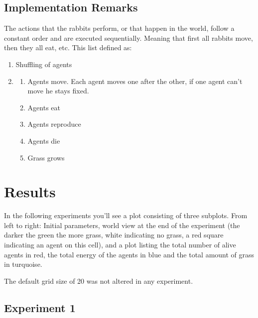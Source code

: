 \documentclass[11pt]{article}
\newenvironment{mEnumerate}
{ \begin{enumerate}
    \setlength{\itemsep}{0pt}
    \setlength{\parskip}{0pt}
    \setlength{\parsep}{0pt}     }
{ \end{enumerate}                  }
\begin{document}
\subsection{Implementation Remarks}\label{sec:implementation-remarks}

The actions that the rabbits perform, or that happen in the world, follow a constant order and are executed sequentially. Meaning that first all rabbits move, then they all eat, etc. This list defined as:

\begin{mEnumerate}
    \item Shuffling of agents
    \item \begin{mEnumerate}
        \item Agents move. Each agent moves one after the other, if one agent can't move he stays fixed.
        \item Agents eat
        \item Agents reproduce
        \item Agents die
        \item Grass grows
    \end{mEnumerate}
\end{mEnumerate}

\section{Results}
In the following experiments you'll see a plot consisting of three subplots. From left to right: Initial parameters, world view at the end of the experiment (the darker the green the more grass, white indicating no grass, a red square indicating an agent on this cell), and a plot listing the total number of alive agents in red, the total energy of the agents in blue and the total amount of grass in turquoise.

The default grid size of 20 was not altered in any experiment.


\subsection{Experiment 1}
\end{document}
